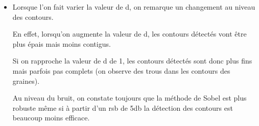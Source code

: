 \documentclass{article}
\begin{document}
\begin{itemize}[leftmargin=*]
	\item Lorsque l'on fait varier la valeur de d, on remarque un changement au niveau des contours.

En effet, lorsqu'on augmente la valeur de d, les contours détectés vont être plus épais mais moins contigus.

Si on rapproche la valeur de d de 1, les contours détectés sont donc plus fins mais parfois pas complets (on observe des trous dans les contours des graines).

Au niveau du bruit, on constate toujours que la méthode de Sobel est plus robuste même si à partir d'un rsb de 5db la détection des contours est beaucoup moins efficace.


\end{itemize}
\end{document}
